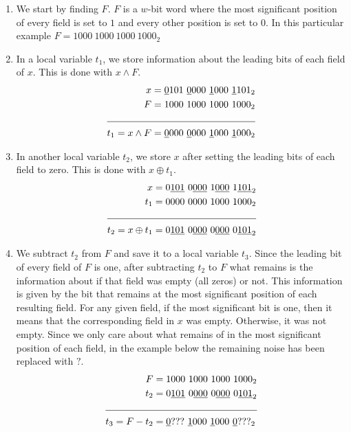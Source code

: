 \begin{enumerate}
    \item \label{blt:msb1}
    We start by finding $F$. $F$ is a $w$-bit word where the most significant position of every field is set to $1$ and every other position is set to $0$. In this particular example $F = 1000\ 1000\ 1000\ 1000_2$
    
    \item \label{blt:msb2}
    In a local variable $t_1$, we store information about the leading bits of each field of $x$. This is done with $x \wedge F$.
    \begin{align*}
                       x &= \underline{0}101\ \underline{0}000\ \underline{1}000\ \underline{1}101_2 \\
                       F &= 1000\ 1000\ 1000\ 1000_2 \\ \cline{1-2} 
        t_1 = x \wedge F &= \underline{0}000\ \underline{0}000\ \underline{1}000\ \underline{1}000_2
    \end{align*}
    
    \item \label{blt:msb3}
    In another local variable $t_2$, we store $x$ after setting the leading bits of each field to zero. This is done with $x \oplus t_1$.
    \begin{align*}
                         x &= 0\underline{101}\ 0\underline{000}\ 1\underline{000}\ 1\underline{101}_2 \\
                       t_1 &= 0000\ 0000\ 1000\ 1000_2 \\ \cline{1-2}
        t_2 = x \oplus t_1 &= 0\underline{101}\ 0\underline{000}\ 0\underline{000}\ 0\underline{101}_2
    \end{align*}
    
    \item \label{blt:msb4}
    We subtract $t_2$ from $F$ and save it to a local variable $t_3$. Since the leading bit of every field of $F$ is one, after subtracting $t_2$ to $F$ what remains is the information about if that field was empty (all zeros) or not. This information is given by the bit that remains at the most significant position of each resulting field. For any given field, if the most significant bit is one, then it means that the corresponding field in $x$ was empty. Otherwise, it was not empty. Since we only care about what remains of in the most significant position of each field, in the example below the remaining noise has been replaced with $?$.
    \begin{align*}
                    F &= 1000\ 1000\ 1000\ 1000_2 \\
                  t_2 &= 0\underline{101}\ 0\underline{000}\ 0\underline{000}\ 0\underline{101}_2 \\ \cline{1-2} 
        t_3 = F - t_2 &= \underline{0}???\ \underline{1}000\ \underline{1}000\ \underline{0}???_2
    \end{align*}
    

\end{enumerate}
